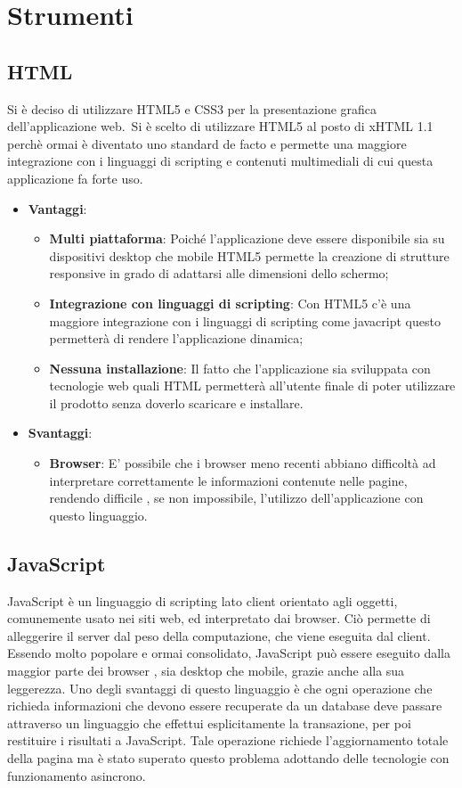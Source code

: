 \section{Strumenti}
	\subsection{HTML}{
		Si è deciso di utilizzare HTML5 e CSS3 per la presentazione grafica dell'applicazione web.\
		Si è scelto di utilizzare HTML5 al posto di xHTML 1.1 perchè ormai è diventato uno standard de facto e permette una maggiore integrazione con i linguaggi di scripting e contenuti multimediali
		di cui questa applicazione fa forte uso.
	
		\begin{itemize}
			\item \textbf{Vantaggi}: 
			\begin{itemize}
				\item \textbf{Multi piattaforma}: Poiché l'applicazione deve essere disponibile sia su dispositivi desktop che mobile HTML5 permette la creazione di strutture responsive in grado di adattarsi alle dimensioni dello schermo;
				\item \textbf{Integrazione con linguaggi di scripting}: Con HTML5 c'è una maggiore integrazione con i linguaggi di scripting come javacript questo permetterà di rendere l'applicazione dinamica;
				\item \textbf{Nessuna installazione}: Il fatto che l'applicazione sia sviluppata con tecnologie web quali HTML permetterà all'utente finale di poter utilizzare il prodotto senza doverlo scaricare e installare.
			\end{itemize}
			\item \textbf{Svantaggi}:
			\begin{itemize}
				\item \textbf{Browser}: E' possibile che i browser meno recenti abbiano difficoltà ad interpretare correttamente le informazioni contenute nelle pagine, rendendo difficile , se non impossibile, l'utilizzo dell'applicazione con questo linguaggio.
			\end{itemize}
		\end{itemize}
		}
	\subsection{JavaScript}{
		JavaScript è un linguaggio di scripting lato client orientato agli oggetti, comunemente usato nei siti web, ed interpretato dai browser. Ciò permette di alleggerire il server dal peso della computazione, che viene eseguita dal client. Essendo molto popolare e ormai consolidato, JavaScript può essere eseguito dalla maggior parte dei browser , sia desktop che mobile, grazie anche alla sua leggerezza. Uno degli svantaggi di questo linguaggio è che ogni operazione che richieda informazioni che devono essere recuperate da un database deve passare attraverso un linguaggio che effettui esplicitamente la transazione, per poi restituire i
		risultati a JavaScript. Tale operazione richiede l’aggiornamento totale della pagina ma è stato superato questo problema adottando delle tecnologie con funzionamento asincrono.
		}
